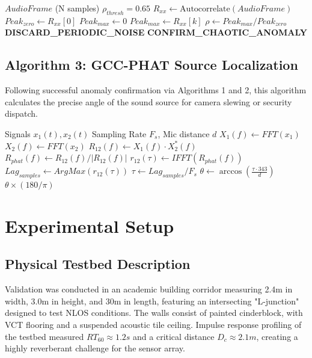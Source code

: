 \documentclass[conference]{IEEEtran}
\begin{document}
\begin{algorithm}
\caption{Autocorrelation Periodic Rejection}
\begin{algorithmic}[1]
\REQUIRE $AudioFrame$ (N samples)
\REQUIRE $\rho_{thresh} = 0.65$
\STATE $R_{xx} \gets \text{Autocorrelate}(AudioFrame)$
\STATE $Peak_{zero} \gets R_{xx}[0]$
\STATE $Peak_{max} \gets 0$
        \STATE $Peak_{max} \gets R_{xx}[k]$
    \ENDIF
\ENDFOR
\STATE $\rho \gets Peak_{max} / Peak_{zero}$
    \STATE \textbf{DISCARD\_PERIODIC\_NOISE}
\ELSE
    \STATE \textbf{CONFIRM\_CHAOTIC\_ANOMALY}
\ENDIF
\end{algorithmic}
\label{alg:periodic}
\end{algorithm}

\subsection{Algorithm 3: GCC-PHAT Source Localization}
Following successful anomaly confirmation via Algorithms 1 and 2, this algorithm calculates the precise angle of the sound source for camera slewing or security dispatch.

\begin{algorithm}
\caption{GCC-PHAT Source Localization}
\begin{algorithmic}[1]
\REQUIRE Signals $x_1(t), x_2(t)$
\REQUIRE Sampling Rate $F_s$, Mic distance $d$
\STATE $X_1(f) \gets FFT(x_1)$
\STATE $X_2(f) \gets FFT(x_2)$
\STATE $R_{12}(f) \gets X_1(f) \cdot X_2^*(f)$ 
\STATE $R_{phat}(f) \gets R_{12}(f) / |R_{12}(f)|$ 
\STATE $r_{12}(\tau) \gets IFFT(R_{phat}(f))$
\STATE $Lag_{samples} \gets ArgMax(r_{12}(\tau))$
\STATE $\tau \gets Lag_{samples} / F_s$
\STATE $\theta \gets \arccos(\frac{\tau \cdot 343}{d})$
\RETURN $\theta \times (180/\pi)$
\end{algorithmic}
\label{alg:tdoa_code}
\end{algorithm}

\section{Experimental Setup}

\subsection{Physical Testbed Description}
Validation was conducted in an academic building corridor measuring 2.4m in width, 3.0m in height, and 30m in length, featuring an intersecting "L-junction" designed to test NLOS conditions. The walls consist of painted cinderblock, with VCT flooring and a suspended acoustic tile ceiling. Impulse response profiling of the testbed measured $RT_{60} \approx 1.2s$ and a critical distance $D_c \approx 2.1m$, creating a highly reverberant challenge for the sensor array.
\end{document}
